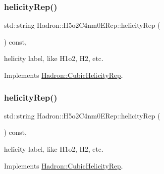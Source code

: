 \mbox{\label{structHadron_1_1H5o2C4nm0ERep_aeacbccc4ba507144d830cd8748f79ecb}} 
\subsubsection{\texorpdfstring{helicityRep()}{helicityRep()}\hspace{0.1cm}{\footnotesize\ttfamily [1/3]}}
{\footnotesize\ttfamily std\+::string Hadron\+::\+H5o2\+C4nm0\+E\+Rep\+::helicity\+Rep (\begin{DoxyParamCaption}{ }\end{DoxyParamCaption}) const\hspace{0.3cm}{\ttfamily [inline]}, {\ttfamily [virtual]}}

helicity label, like H1o2, H2, etc. 

Implements \mbox{\hyperlink{structHadron_1_1CubicHelicityRep_af1096946b7470edf0a55451cc662f231}{Hadron\+::\+Cubic\+Helicity\+Rep}}.

\mbox{\label{structHadron_1_1H5o2C4nm0ERep_aeacbccc4ba507144d830cd8748f79ecb}} 
\subsubsection{\texorpdfstring{helicityRep()}{helicityRep()}\hspace{0.1cm}{\footnotesize\ttfamily [2/3]}}
{\footnotesize\ttfamily std\+::string Hadron\+::\+H5o2\+C4nm0\+E\+Rep\+::helicity\+Rep (\begin{DoxyParamCaption}{ }\end{DoxyParamCaption}) const\hspace{0.3cm}{\ttfamily [inline]}, {\ttfamily [virtual]}}

helicity label, like H1o2, H2, etc. 

Implements \mbox{\hyperlink{structHadron_1_1CubicHelicityRep_af1096946b7470edf0a55451cc662f231}{Hadron\+::\+Cubic\+Helicity\+Rep}}.

\mbox{\label{structHadron_1_1H5o2C4nm0ERep_aeacbccc4ba507144d830cd8748f79ecb}} 
